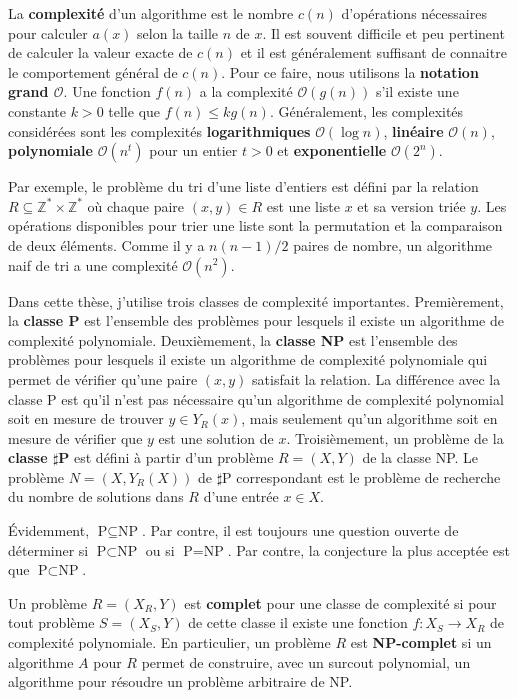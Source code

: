 La \textbf{complexité} d'un algorithme est le nombre $c(n)$ d'opérations nécessaires
pour calculer $a(x)$ selon la taille $n$ de $x$.
Il est souvent difficile et peu pertinent de calculer la valeur exacte de $c(n)$
et il est généralement suffisant de connaitre le comportement général de $c(n)$.
Pour ce faire,
nous utilisons la \textbf{notation grand $\mathcal O$}.
Une fonction $f(n)$ a la complexité $\mathcal O(g(n))$ s'il existe
une constante $k > 0$ telle que $f(n) \leq k g(n)$.
Généralement,
les complexités considérées sont les complexités \textbf{logarithmiques} $\mathcal O(\log n)$,
\textbf{linéaire} $\mathcal O(n)$,
\textbf{polynomiale} $\mathcal O(n^t)$ pour un entier $t > 0$
et \textbf{exponentielle} $\mathcal O(2^n)$.

Par exemple,
le problème du tri d'une liste d'entiers est défini par la relation
$R \subseteq \mathbb Z^* \times \mathbb Z^*$
où chaque paire $(x, y) \in R$ est une liste $x$ et sa version triée $y$.
Les opérations disponibles pour trier une liste sont la permutation et
la comparaison de deux éléments.
Comme il y a $n(n-1)/2$ paires de nombre,
un algorithme naif de tri a une complexité $\mathcal O(n^2)$.

Dans cette thèse,
j'utilise trois classes de complexité importantes.
Premièrement,
la \textbf{classe P} est l'ensemble des problèmes
pour lesquels il existe un algorithme de complexité polynomiale.
Deuxièmement,
la \textbf{classe NP} est l'ensemble des problèmes
pour lesquels il existe un algorithme de complexité polynomiale
qui permet de vérifier qu'une paire $(x, y)$ satisfait la relation.
La différence avec la classe P est qu'il n'est pas nécessaire qu'un 
algorithme de complexité polynomial soit en mesure de trouver $y \in Y_R(x)$,
mais seulement qu'un algorithme soit en mesure de vérifier que $y$ est une solution
de $x$.
Troisièmement,
un problème de la \textbf{classe $\sharp$P} est défini à partir d'un problème
$R = (X, Y)$ de la classe NP.
Le problème $N = (X, Y_R(X))$ de $\sharp$P correspondant est le problème de
recherche du nombre de solutions dans $R$ d'une entrée $x \in X$.

Évidemment, $\text{P} \subseteq \text{NP}$.
Par contre, 
il est toujours une question ouverte de déterminer si
$\text{P} \subset \text{NP}$ ou si $\text{P} = \text{NP}$.
Par contre,
la conjecture la plus acceptée est que $\text{P} \subset \text{NP}$.

Un problème $R = (X_R, Y)$ est \textbf{complet} pour une classe de complexité
si pour tout problème $S = (X_S, Y)$ de cette classe il existe une fonction 
$f: X_S \to X_R$ de complexité polynomiale.
En particulier,
un problème $R$ est \textbf{NP-complet} si un algorithme $A$ pour $R$
permet de construire, avec un surcout polynomial,
un algorithme pour résoudre un problème arbitraire de NP.

